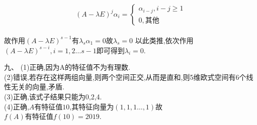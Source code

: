 \documentclass[UTF8]{article}
\begin{document}
\begin{equation*}{(A-\lambda E)}^j\alpha_{i}=
\begin{cases}
    \alpha_{i-j},i-j \geqslant 1\\
    0,\text{其他}
\end{cases}\end{equation*}\\
故作用${(A-\lambda E)}^{s-1}$有$\lambda_s\alpha_1=0$故$\lambda_s=0$
以此类推,依次作用${(A-\lambda E)}^{s-i},i=1,2\ldots s-1$即可得到$\lambda_i=0$.
\par
九、
(1)正确,因为A的特征值不为有理数.\\
(2)错误,若存在这样两组向量,则两个空间正交,从而是直和,则5维欧式空间有6个线性无关的向量,矛盾.\\
(3)正确,该式子结果只能为0,2,4.\\
(4)正确,$A\text{有特征值10,其特征向量为}(1,1,1\ldots,1)$故$f(A)\text{有特征值}f(10)=2019$.
\end{document}

